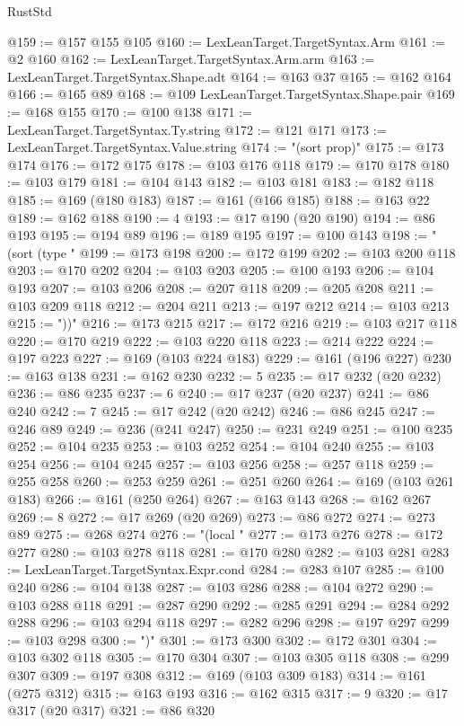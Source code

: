 \begin{lexlean}{RustStd}
\begin{coremodule}
@159 := @157 @155 @105
@160 := LexLeanTarget.TargetSyntax.Arm
@161 := @2 @160
@162 := LexLeanTarget.TargetSyntax.Arm.arm
@163 := LexLeanTarget.TargetSyntax.Shape.adt
@164 := @163 @37
@165 := @162 @164
@166 := @165 @89
@168 := @109 LexLeanTarget.TargetSyntax.Shape.pair
@169 := @168 @155
@170 := @100 @138
@171 := LexLeanTarget.TargetSyntax.Ty.string
@172 := @121 @171
@173 := LexLeanTarget.TargetSyntax.Value.string
@174 := "(sort prop)"
@175 := @173 @174
@176 := @172 @175
@178 := @103 @176 @118
@179 := @170 @178
@180 := @103 @179
@181 := @104 @143
@182 := @103 @181
@183 := @182 @118
@185 := @169 (@180 @183)
@187 := @161 (@166 @185)
@188 := @163 @22
@189 := @162 @188
@190 := 4
@193 := @17 @190 (@20 @190)
@194 := @86 @193
@195 := @194 @89
@196 := @189 @195
@197 := @100 @143
@198 := "(sort (type "
@199 := @173 @198
@200 := @172 @199
@202 := @103 @200 @118
@203 := @170 @202
@204 := @103 @203
@205 := @100 @193
@206 := @104 @193
@207 := @103 @206
@208 := @207 @118
@209 := @205 @208
@211 := @103 @209 @118
@212 := @204 @211
@213 := @197 @212
@214 := @103 @213
@215 := "))"
@216 := @173 @215
@217 := @172 @216
@219 := @103 @217 @118
@220 := @170 @219
@222 := @103 @220 @118
@223 := @214 @222
@224 := @197 @223
@227 := @169 (@103 @224 @183)
@229 := @161 (@196 @227)
@230 := @163 @138
@231 := @162 @230
@232 := 5
@235 := @17 @232 (@20 @232)
@236 := @86 @235
@237 := 6
@240 := @17 @237 (@20 @237)
@241 := @86 @240
@242 := 7
@245 := @17 @242 (@20 @242)
@246 := @86 @245
@247 := @246 @89
@249 := @236 (@241 @247)
@250 := @231 @249
@251 := @100 @235
@252 := @104 @235
@253 := @103 @252
@254 := @104 @240
@255 := @103 @254
@256 := @104 @245
@257 := @103 @256
@258 := @257 @118
@259 := @255 @258
@260 := @253 @259
@261 := @251 @260
@264 := @169 (@103 @261 @183)
@266 := @161 (@250 @264)
@267 := @163 @143
@268 := @162 @267
@269 := 8
@272 := @17 @269 (@20 @269)
@273 := @86 @272
@274 := @273 @89
@275 := @268 @274
@276 := "(local "
@277 := @173 @276
@278 := @172 @277
@280 := @103 @278 @118
@281 := @170 @280
@282 := @103 @281
@283 := LexLeanTarget.TargetSyntax.Expr.cond
@284 := @283 @107
@285 := @100 @240
@286 := @104 @138
@287 := @103 @286
@288 := @104 @272
@290 := @103 @288 @118
@291 := @287 @290
@292 := @285 @291
@294 := @284 @292 @288
@296 := @103 @294 @118
@297 := @282 @296
@298 := @197 @297
@299 := @103 @298
@300 := ")"
@301 := @173 @300
@302 := @172 @301
@304 := @103 @302 @118
@305 := @170 @304
@307 := @103 @305 @118
@308 := @299 @307
@309 := @197 @308
@312 := @169 (@103 @309 @183)
@314 := @161 (@275 @312)
@315 := @163 @193
@316 := @162 @315
@317 := 9
@320 := @17 @317 (@20 @317)
@321 := @86 @320

\end{coremodule}
\end{lexlean}
